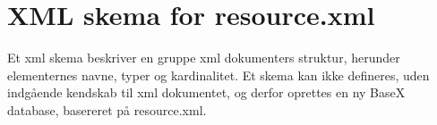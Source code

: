 \chapter{XML skema for resource.xml}
\label{sec:XML skema}

Et xml skema beskriver en gruppe xml dokumenters struktur, herunder elementernes navne, typer og kardinalitet. Et skema kan ikke defineres, uden indgående kendskab til xml dokumentet, og derfor oprettes en ny BaseX database, basereret på resource.xml.